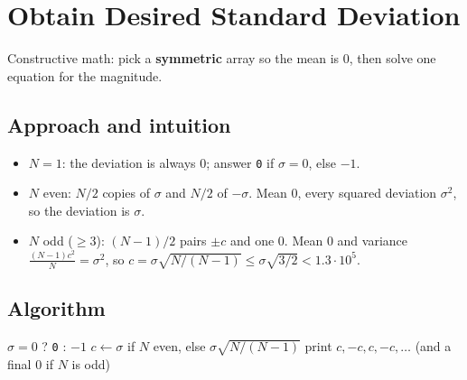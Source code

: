 \section{Obtain Desired Standard Deviation}
\label{sec:n-stddev}


\begin{patternbox}
Constructive math: pick a \textbf{symmetric} array so the mean is $0$, then
solve one equation for the magnitude.
\end{patternbox}

\subsection*{Approach and intuition}

\begin{itemize}
  \item $N=1$: the deviation is always $0$; answer \texttt{0} if $\sigma=0$,
        else $-1$.
  \item $N$ even: $N/2$ copies of $\sigma$ and $N/2$ of $-\sigma$. Mean $0$,
        every squared deviation $\sigma^2$, so the deviation is $\sigma$.
  \item $N$ odd ($\ge3$): $(N-1)/2$ pairs $\pm c$ and one $0$. Mean $0$ and
        variance $\frac{(N-1)c^2}{N}=\sigma^2$, so
        $c=\sigma\sqrt{N/(N-1)}\le\sigma\sqrt{3/2}<1.3\cdot10^5$.
\end{itemize}

\subsection*{Algorithm}
\begin{algorithmic}[1]
 \Return $\sigma=0$ ? \texttt{0} : $-1$ \EndIf
\State $c\gets\sigma$ if $N$ even, else $\sigma\sqrt{N/(N-1)}$
\State print $c,-c,c,-c,\dots$ (and a final $0$ if $N$ is odd)
\end{algorithmic}


